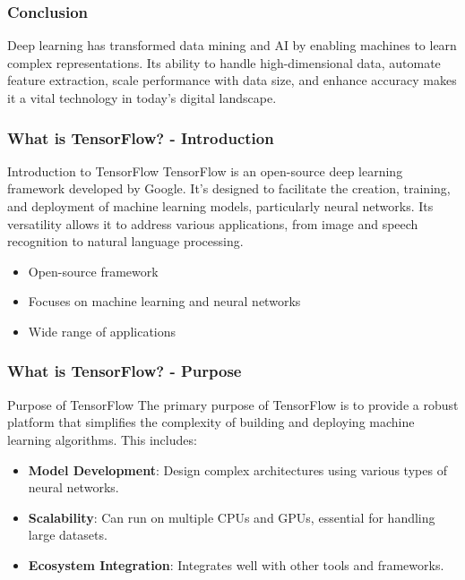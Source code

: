 \documentclass[aspectratio=169]{beamer}
\begin{document}
\begin{frame}[fragile]
    \frametitle{Conclusion}
    Deep learning has transformed data mining and AI by enabling machines to learn complex representations. 
    Its ability to handle high-dimensional data, automate feature extraction, scale performance with data size, and enhance accuracy makes it a vital technology in today's digital landscape.
\end{frame}

\begin{frame}[fragile]
    \frametitle{What is TensorFlow? - Introduction}
    \begin{block}{Introduction to TensorFlow}
    TensorFlow is an open-source deep learning framework developed by Google. It's designed to facilitate the creation, training, and deployment of machine learning models, particularly neural networks. Its versatility allows it to address various applications, from image and speech recognition to natural language processing.
    \end{block}
    
    \begin{itemize}
        \item Open-source framework
        \item Focuses on machine learning and neural networks
        \item Wide range of applications
    \end{itemize}
\end{frame}

\begin{frame}[fragile]
    \frametitle{What is TensorFlow? - Purpose}
    \begin{block}{Purpose of TensorFlow}
    The primary purpose of TensorFlow is to provide a robust platform that simplifies the complexity of building and deploying machine learning algorithms. This includes:
    \end{block}
    
    \begin{itemize}
        \item \textbf{Model Development}: Design complex architectures using various types of neural networks.
        \item \textbf{Scalability}: Can run on multiple CPUs and GPUs, essential for handling large datasets.
        \item \textbf{Ecosystem Integration}: Integrates well with other tools and frameworks.
    \end{itemize}
\end{frame}
\end{document}

